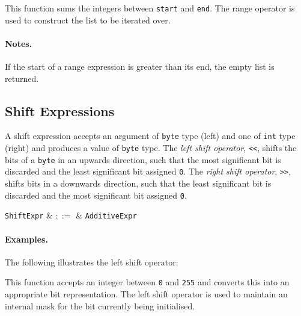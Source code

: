 This function sums the integers between \lstinline{start} and \lstinline{end}.  The range operator is used to construct the list to be iterated over.

\paragraph{Notes.}  If the start of a range expression is greater than its end, the empty list is returned.


\subsection{Shift Expressions}
\label{c_expr_shift}

A shift expression accepts an argument of \lstinline{byte} type (left) and one of \lstinline{int} type (right) and produces a value of \lstinline{byte} type.  The {\em left shift operator}, \lstinline{<<}, shifts the bits of a \lstinline{byte} in an upwards direction, such that the most significant bit is discarded and the least significant bit assigned \lstinline{0}.  The {\em right shift operator}, \lstinline{>>}, shifts bits in a downwards direction, such that the least significant bit is discarded and the most significant bit assigned \lstinline{0}.  

\begin{syntax}
  \verb+ShiftExpr+ & $::=$ & \verb+AdditiveExpr+\ 
\end{syntax}

\paragraph{Examples.} The following illustrates the left shift operator:



This function accepts an integer between \lstinline{0} and \lstinline{255} and converts this into an appropriate bit representation.  The left shift operator is used to maintain an internal mask for the bit currently being initialised.


